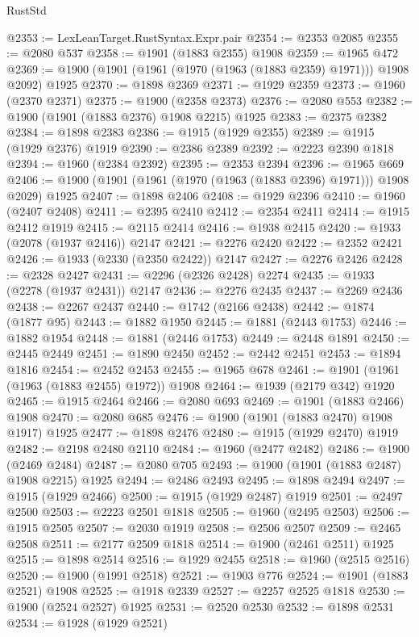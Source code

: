 \begin{lexlean}{RustStd}
\begin{coremodule}
@2353 := LexLeanTarget.RustSyntax.Expr.pair
@2354 := @2353 @2085
@2355 := @2080 @537
@2358 := @1901 (@1883 @2355) @1908
@2359 := @1965 @472
@2369 := @1900 (@1901 (@1961 (@1970 (@1963 (@1883 @2359) @1971))) @1908 @2092) @1925
@2370 := @1898 @2369
@2371 := @1929 @2359
@2373 := @1960 (@2370 @2371)
@2375 := @1900 (@2358 @2373)
@2376 := @2080 @553
@2382 := @1900 (@1901 (@1883 @2376) @1908 @2215) @1925
@2383 := @2375 @2382
@2384 := @1898 @2383
@2386 := @1915 (@1929 @2355)
@2389 := @1915 (@1929 @2376) @1919
@2390 := @2386 @2389
@2392 := @2223 @2390 @1818
@2394 := @1960 (@2384 @2392)
@2395 := @2353 @2394
@2396 := @1965 @669
@2406 := @1900 (@1901 (@1961 (@1970 (@1963 (@1883 @2396) @1971))) @1908 @2029) @1925
@2407 := @1898 @2406
@2408 := @1929 @2396
@2410 := @1960 (@2407 @2408)
@2411 := @2395 @2410
@2412 := @2354 @2411
@2414 := @1915 @2412 @1919
@2415 := @2115 @2414
@2416 := @1938 @2415
@2420 := @1933 (@2078 (@1937 @2416)) @2147
@2421 := @2276 @2420
@2422 := @2352 @2421
@2426 := @1933 (@2330 (@2350 @2422)) @2147
@2427 := @2276 @2426
@2428 := @2328 @2427
@2431 := @2296 (@2326 @2428) @2274
@2435 := @1933 (@2278 (@1937 @2431)) @2147
@2436 := @2276 @2435
@2437 := @2269 @2436
@2438 := @2267 @2437
@2440 := @1742 (@2166 @2438)
@2442 := @1874 (@1877 @95)
@2443 := @1882 @1950
@2445 := @1881 (@2443 @1753)
@2446 := @1882 @1954
@2448 := @1881 (@2446 @1753)
@2449 := @2448 @1891
@2450 := @2445 @2449
@2451 := @1890 @2450
@2452 := @2442 @2451
@2453 := @1894 @1816
@2454 := @2452 @2453
@2455 := @1965 @678
@2461 := @1901 (@1961 (@1963 (@1883 @2455) @1972)) @1908
@2464 := @1939 (@2179 @342) @1920
@2465 := @1915 @2464
@2466 := @2080 @693
@2469 := @1901 (@1883 @2466) @1908
@2470 := @2080 @685
@2476 := @1900 (@1901 (@1883 @2470) @1908 @1917) @1925
@2477 := @1898 @2476
@2480 := @1915 (@1929 @2470) @1919
@2482 := @2198 @2480 @2110
@2484 := @1960 (@2477 @2482)
@2486 := @1900 (@2469 @2484)
@2487 := @2080 @705
@2493 := @1900 (@1901 (@1883 @2487) @1908 @2215) @1925
@2494 := @2486 @2493
@2495 := @1898 @2494
@2497 := @1915 (@1929 @2466)
@2500 := @1915 (@1929 @2487) @1919
@2501 := @2497 @2500
@2503 := @2223 @2501 @1818
@2505 := @1960 (@2495 @2503)
@2506 := @1915 @2505
@2507 := @2030 @1919
@2508 := @2506 @2507
@2509 := @2465 @2508
@2511 := @2177 @2509 @1818
@2514 := @1900 (@2461 @2511) @1925
@2515 := @1898 @2514
@2516 := @1929 @2455
@2518 := @1960 (@2515 @2516)
@2520 := @1900 (@1991 @2518)
@2521 := @1903 @776
@2524 := @1901 (@1883 @2521) @1908
@2525 := @1918 @2339
@2527 := @2257 @2525 @1818
@2530 := @1900 (@2524 @2527) @1925
@2531 := @2520 @2530
@2532 := @1898 @2531
@2534 := @1928 (@1929 @2521)

\end{coremodule}
\end{lexlean}
